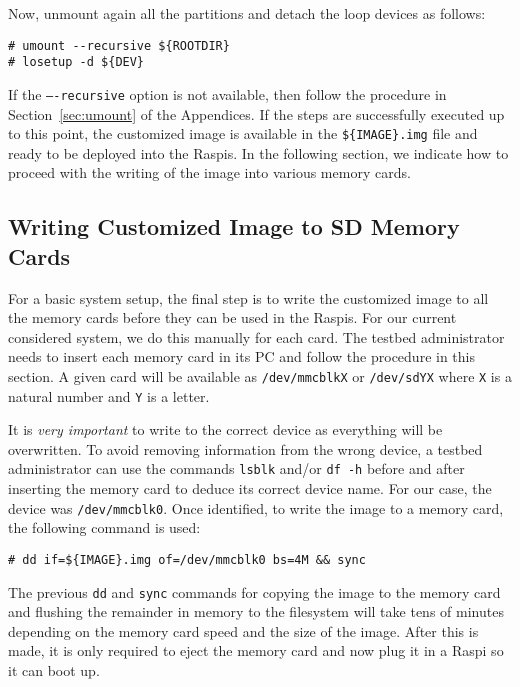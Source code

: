 Now, unmount again all the partitions and detach the loop devices as follows:
\begin{lstlisting}[]
# umount --recursive ${ROOTDIR}
# losetup -d ${DEV}
\end{lstlisting}
\FloatBarrier
\vspace{-5mm}

If the \texttt{----recursive} option is not available, then follow the
procedure in Section~\ref{sec:umount} of the Appendices.
If the steps are successfully executed up to this point, the customized image
is available in the \texttt{\$\{IMAGE\}.img} file and ready to be deployed
into the \ac{Raspi}s. In the following section, we indicate how to proceed
with the writing of the image into various memory cards.

\subsection{Writing Customized Image to SD Memory Cards}
For a basic system setup, the final step is to write the customized image
to all the memory cards before they can be used in the \ac{Raspi}s. For
our current considered system, we do this manually for each card.
The testbed administrator needs to insert each memory card in its \ac{PC}
and follow the procedure in this section. A given card will be available as
\texttt{/dev/mmcblkX} or \texttt{/dev/sdYX} where \texttt{X} is a natural number
and \texttt{Y} is a letter.

It is \textit{very important} to write to the correct device as
everything will be overwritten. To avoid removing information from the
wrong device, a testbed administrator can use the commands \texttt{lsblk}
and/or \texttt{df -h} before and after inserting the memory card to deduce
its correct device name.
For our case, the device was \texttt{/dev/mmcblk0}. Once identified, to write
the image to a memory card, the following command is used:

\begin{lstlisting}[]
# dd if=${IMAGE}.img of=/dev/mmcblk0 bs=4M && sync
\end{lstlisting}
\FloatBarrier
\vspace{-5mm}

The previous \texttt{dd} and \texttt{sync} commands for copying the image to
the memory card and flushing the remainder in memory to the filesystem
will take tens of minutes depending on the memory card speed and the size of
the image. After this is made, it is only required
to eject the memory card and now plug it in a \ac{Raspi} so it can boot up.

